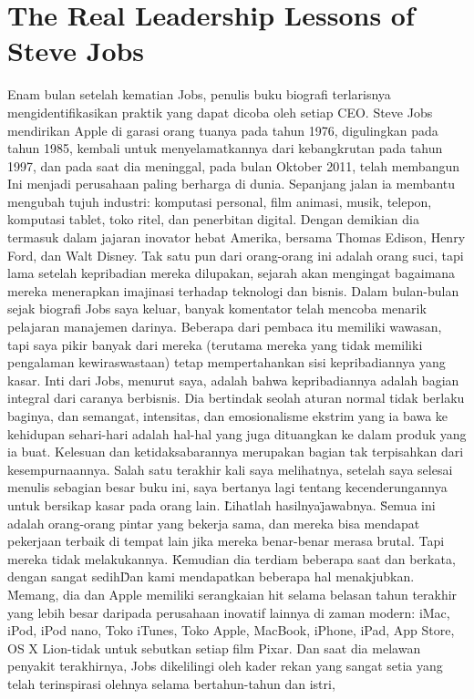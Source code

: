 \section{The Real Leadership Lessons of Steve Jobs}
Enam bulan setelah kematian Jobs, penulis buku biografi terlarisnya mengidentifikasikan praktik yang dapat dicoba oleh setiap CEO.
Steve Jobs mendirikan Apple di garasi orang tuanya pada tahun 1976, digulingkan pada tahun 1985, kembali untuk menyelamatkannya dari kebangkrutan pada tahun 1997, 
dan pada saat dia meninggal, pada bulan Oktober 2011, telah membangun Ini menjadi perusahaan paling berharga di dunia. Sepanjang jalan ia membantu mengubah tujuh industri: 
komputasi personal, film animasi, musik, telepon, komputasi tablet, toko ritel, dan penerbitan digital. Dengan demikian dia termasuk dalam jajaran inovator hebat Amerika, 
bersama Thomas Edison, Henry Ford, dan Walt Disney. Tak satu pun dari orang-orang ini adalah orang suci, tapi lama setelah kepribadian mereka dilupakan, sejarah akan mengingat 
bagaimana mereka menerapkan imajinasi terhadap teknologi dan bisnis. Dalam bulan-bulan sejak biografi Jobs saya keluar, banyak komentator telah mencoba menarik pelajaran manajemen darinya. 
Beberapa dari pembaca itu memiliki wawasan, tapi saya pikir banyak dari mereka (terutama mereka yang tidak memiliki pengalaman kewiraswastaan) tetap mempertahankan sisi kepribadiannya yang kasar. 
Inti dari Jobs, menurut saya, adalah bahwa kepribadiannya adalah bagian integral dari caranya berbisnis. Dia bertindak seolah aturan normal tidak berlaku baginya, dan semangat, intensitas, dan emosionalisme
ekstrim yang ia bawa ke kehidupan sehari-hari adalah hal-hal yang juga dituangkan ke dalam produk yang ia buat. Kelesuan dan ketidaksabarannya merupakan bagian tak terpisahkan dari kesempurnaannya. 
Salah satu terakhir kali saya melihatnya, setelah saya selesai menulis sebagian besar buku ini, saya bertanya lagi tentang kecenderungannya untuk bersikap kasar pada orang lain. \"Lihatlah hasilnya\" 
jawabnya. \"Semua ini adalah orang-orang pintar yang bekerja sama, dan mereka bisa mendapat pekerjaan terbaik di tempat lain jika mereka benar-benar merasa brutal. Tapi mereka tidak melakukannya. 
\"Kemudian dia terdiam beberapa saat dan berkata, dengan sangat sedih\" Dan kami mendapatkan beberapa hal menakjubkan. \"Memang, dia dan Apple memiliki serangkaian hit 
selama belasan tahun terakhir yang lebih besar daripada perusahaan inovatif lainnya di zaman modern: iMac, iPod, iPod nano, Toko iTunes, Toko Apple, MacBook, iPhone, iPad, App Store, 
OS X Lion-tidak untuk
sebutkan setiap film Pixar. Dan saat dia melawan penyakit terakhirnya, Jobs dikelilingi oleh kader rekan yang sangat setia yang telah terinspirasi olehnya selama bertahun-tahun dan istri, 
